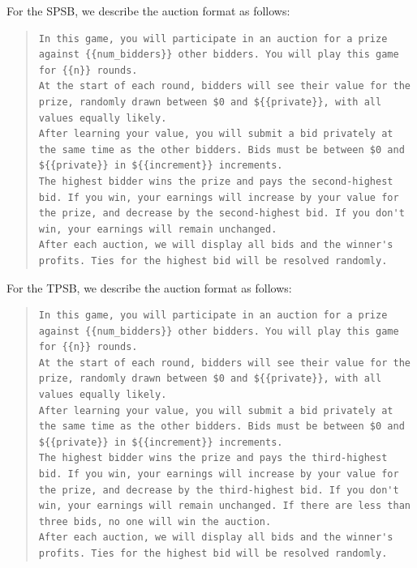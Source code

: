\documentclass{article} %
\begin{document}
For the SPSB, we describe the auction format as follows:
\begin{quote}
\begin{lstlisting}[basicstyle=\ttfamily, breaklines=true]
In this game, you will participate in an auction for a prize against {{num_bidders}} other bidders. You will play this game for {{n}} rounds.
At the start of each round, bidders will see their value for the prize, randomly drawn between $0 and ${{private}}, with all values equally likely.
After learning your value, you will submit a bid privately at the same time as the other bidders. Bids must be between $0 and ${{private}} in ${{increment}} increments.
The highest bidder wins the prize and pays the second-highest bid. If you win, your earnings will increase by your value for the prize, and decrease by the second-highest bid. If you don't win, your earnings will remain unchanged.
After each auction, we will display all bids and the winner's profits. Ties for the highest bid will be resolved randomly.
\end{lstlisting}
\end{quote}

For the TPSB, we describe the auction format as follows:
\begin{quote}
\begin{lstlisting}[basicstyle=\ttfamily, breaklines=true]
In this game, you will participate in an auction for a prize against {{num_bidders}} other bidders. You will play this game for {{n}} rounds.
At the start of each round, bidders will see their value for the prize, randomly drawn between $0 and ${{private}}, with all values equally likely.
After learning your value, you will submit a bid privately at the same time as the other bidders. Bids must be between $0 and ${{private}} in ${{increment}} increments.
The highest bidder wins the prize and pays the third-highest bid. If you win, your earnings will increase by your value for the prize, and decrease by the third-highest bid. If you don't win, your earnings will remain unchanged. If there are less than three bids, no one will win the auction.
After each auction, we will display all bids and the winner's profits. Ties for the highest bid will be resolved randomly.
\end{lstlisting}
\end{quote}
\end{document}
